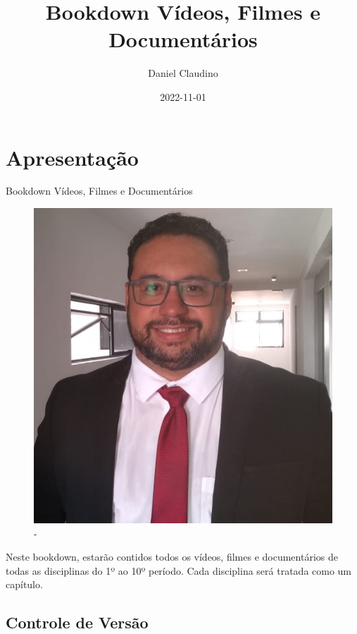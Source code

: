 \documentclass[
]{book}
\title{Bookdown Vídeos, Filmes e Documentários}
\author{Daniel Claudino}
\date{2022-11-01}
\begin{document}
\maketitle

{
\setcounter{tocdepth}{1}
\tableofcontents
}
\hypertarget{apresentauxe7uxe3o}{%
\chapter{Apresentação}\label{apresentauxe7uxe3o}}

Bookdown Vídeos, Filmes e Documentários

\begin{figure}

{\centering \includegraphics[width=0.5\linewidth]{imagens/FOTO-PERFIL-DANIEL-CLAUDINO-2020} 

}

\caption{-}\label{fig:unnamed-chunk-1}
\end{figure}

Neste bookdown, estarão contidos todos os vídeos, filmes e documentários de todas as disciplinas do 1º ao 10º período. Cada disciplina será tratada como um capítulo.

\hypertarget{controle-de-versuxe3o}{%
\section{Controle de Versão}\label{controle-de-versuxe3o}}
\end{document}
